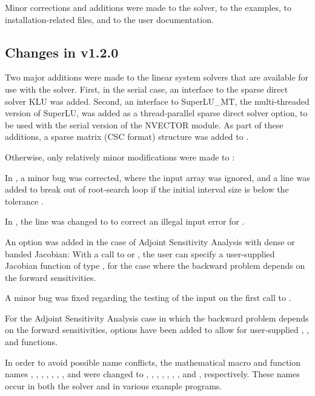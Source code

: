 Minor corrections and additions were made to the {\idas} solver, to the
examples, to installation-related files, and to the user documentation.


\subsection*{Changes in v1.2.0}

Two major additions were made to the linear system solvers that are
available for use with the {\idas} solver.  First, in the serial case,
an interface to the sparse direct solver KLU was added.
Second, an interface to SuperLU\_MT, the multi-threaded version of
SuperLU, was added as a thread-parallel sparse direct solver option,
to be used with the serial version of the NVECTOR module.
As part of these additions, a sparse matrix (CSC format) structure 
was added to {\idas}.

Otherwise, only relatively minor modifications were made to {\idas}:

In , a minor bug was corrected, where the input
array  was ignored, and a line was added to break out of
root-search loop if the initial interval size is below the tolerance
.

In , the line  was changed to
 to correct an illegal input error for .

An option was added in the case of Adjoint Sensitivity Analysis with
dense or banded Jacobian:  With a call to  or
, the user can specify a user-supplied Jacobian
function of type , for the case where the backward
problem depends on the forward sensitivities.

A minor bug was fixed regarding the testing of the input  on
the first call to .

For the Adjoint Sensitivity Analysis case in which the backward problem
depends on the forward sensitivities, options have been added to allow
for user-supplied , , and  functions.

In order to avoid possible name conflicts, the mathematical macro
and function names , , , , ,
, , and  were changed to
, , , , ,
, , and , respectively.
These names occur in both the solver and in various example programs.

